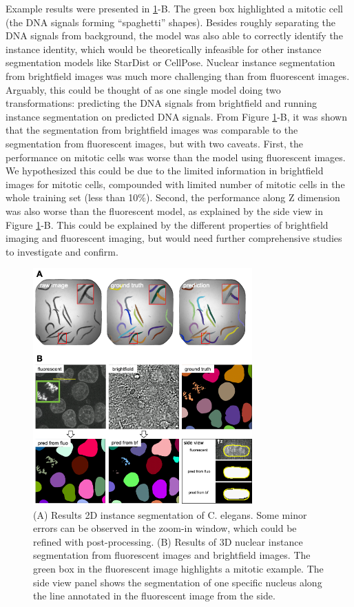 Example results were presented in \ref{fig:instance}-B. The green box highlighted a mitotic cell (the DNA signals forming ``spaghetti'' shapes). Besides roughly separating the DNA signals from background, the model was also able to correctly identify the instance identity, which would be theoretically infeasible for other instance segmentation models like StarDist or CellPose. Nuclear instance segmentation from brightfield images was much more challenging than from fluorescent images. Arguably, this could be thought of as one single model doing two transformations: predicting the DNA signals from brightfield and running instance segmentation on predicted DNA signals. From Figure \ref{fig:instance}-B, it was shown that the segmentation from brightfield images was comparable to the segmentation from fluorescent images, but with two caveats. First, the performance on mitotic cells was worse than the model using fluorescent images. We hypothesized this could be due to the limited information in brightfield images for mitotic cells, compounded with limited number of mitotic cells in the whole training set (less than 10\%). Second, the performance along Z dimension was also worse than the fluorescent model, as explained by the side view in Figure \ref{fig:instance}-B. This could be explained by the different properties of brightfield imaging and fluorescent imaging, but would need further comprehensive studies to investigate and confirm.

\begin{figure}
\hypertarget{fig:instance}{%
\centering
\includegraphics[width=0.75\textwidth,height=\textheight]{images/embedseg.png}
\caption{(A) Results 2D instance segmentation of C. elegans. Some minor errors can be observed in the zoom-in window, which could be refined with post-processing. (B) Results of 3D nuclear instance segmentation from fluorescent images and brightfield images. The green box in the fluorescent image highlights a mitotic example. The side view panel shows the segmentation of one specific nucleus along the line annotated in the fluorescent image from the side.}\label{fig:instance}
}
\end{figure}

